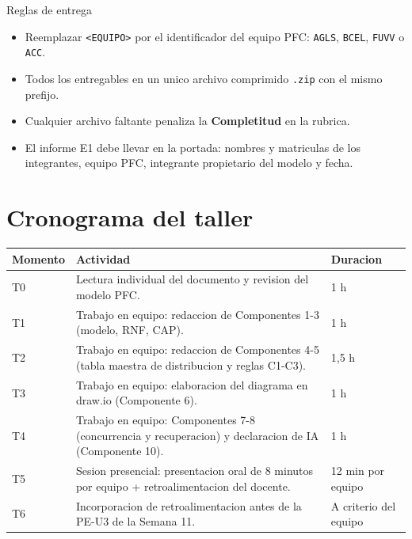\documentclass[11pt,a4paper]{article}
\newcommand{\codigo}[1]{\texttt{\textcolor{uteqBlue}{#1}}}
\begin{document}
\vspace{0.3em}

\begin{cajaalerta}{Reglas de entrega}
\begin{itemize}
\item Reemplazar \codigo{\textless EQUIPO\textgreater} por el identificador del equipo PFC: \codigo{AGLS}, \codigo{BCEL}, \codigo{FUVV} o \codigo{ACC}.
\item Todos los entregables en un unico archivo comprimido \codigo{.zip} con el mismo prefijo.
\item Cualquier archivo faltante penaliza la \textbf{Completitud} en la rubrica.
\item El informe E1 debe llevar en la portada: nombres y matriculas de los integrantes, equipo PFC, integrante propietario del modelo y fecha.
\end{itemize}
\end{cajaalerta}

\section{Cronograma del taller}

\renewcommand{\arraystretch}{1.25}
\begin{xltabular}{\linewidth}{@{}lXl@{}}
\toprule
\textbf{Momento} & \textbf{Actividad} & \textbf{Duracion} \\
\midrule
T0 & Lectura individual del documento y revision del modelo PFC. & 1 h \\
T1 & Trabajo en equipo: redaccion de Componentes 1-3 (modelo, RNF, CAP). & 1 h \\
T2 & Trabajo en equipo: redaccion de Componentes 4-5 (tabla maestra de distribucion y reglas C1-C3). & 1,5 h \\
T3 & Trabajo en equipo: elaboracion del diagrama en draw.io (Componente 6). & 1 h \\
T4 & Trabajo en equipo: Componentes 7-8 (concurrencia y recuperacion) y declaracion de IA (Componente 10). & 1 h \\
T5 & Sesion presencial: presentacion oral de 8 minutos por equipo + retroalimentacion del docente. & 12 min por equipo \\
T6 & Incorporacion de retroalimentacion antes de la PE-U3 de la Semana 11. & A criterio del equipo \\
\bottomrule
\end{xltabular}
\end{document}
